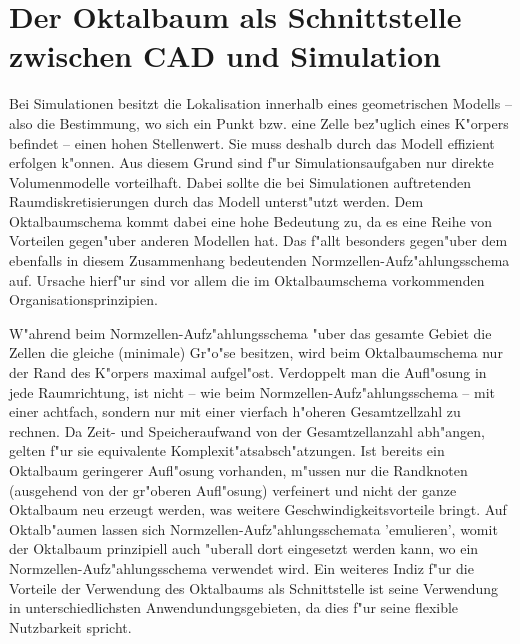 %
%

\section{Der Oktalbaum als Schnittstelle zwischen CAD und Simulation}
\label{schnittstelle_octree}
Bei Simulationen besitzt die Lokalisation innerhalb eines geometrischen 
Modells -- also die Bestimmung, wo sich ein Punkt bzw. eine Zelle bez"uglich 
eines K"orpers befindet -- einen hohen Stellenwert. 
Sie muss deshalb durch das Modell effizient erfolgen k"onnen. 
Aus diesem Grund sind f"ur Simulationsaufgaben nur direkte 
Volumenmodelle vorteilhaft. Dabei sollte die bei Simulationen auftretenden 
Raumdiskretisierungen durch das Modell unterst"utzt werden. Dem 
Oktalbaumschema kommt dabei eine hohe Bedeutung zu, da es eine Reihe von 
Vorteilen gegen"uber anderen Modellen hat. Das f"allt besonders gegen"uber 
dem ebenfalls in diesem Zusammenhang bedeutenden Normzellen-Aufz"ahlungsschema 
auf. Ursache hierf"ur sind vor allem die im Oktalbaumschema vorkommenden 
Organisationsprinzipien.
 
W"ahrend beim Normzellen-Aufz"ahlungsschema "uber 
das gesamte Gebiet die Zellen die gleiche (minimale) Gr"o"se besitzen, wird 
beim Oktalbaumschema nur der Rand des K"orpers maximal aufgel"ost. Verdoppelt 
man die Aufl"osung in jede Raumrichtung, ist nicht -- wie beim 
Normzellen-Aufz"ahlungsschema -- mit einer achtfach, sondern nur mit einer 
vierfach h"oheren Gesamtzellzahl zu rechnen. 
Da Zeit- und Speicheraufwand von der Gesamtzellanzahl abh"angen, gelten 
f"ur sie equivalente Komplexit"atsabsch"atzungen. Ist bereits ein Oktalbaum 
geringerer Aufl"osung vorhanden, m"ussen nur die Randknoten (ausgehend von 
der gr"oberen Aufl"osung) verfeinert und nicht 
der ganze Oktalbaum neu erzeugt 
werden, was weitere Geschwindigkeitsvorteile 
bringt. 
Auf Oktalb"aumen lassen sich Normzellen-Aufz"ahlungsschemata 
'emulieren', 
womit der Oktalbaum prinzipiell auch "uberall dort eingesetzt 
werden kann, wo ein Normzellen-Aufz"ahlungsschema verwendet wird. 
Ein weiteres Indiz f"ur die Vorteile der Verwendung des Oktalbaums als 
Schnittstelle ist seine Verwendung in unterschiedlichsten 
Anwendundungsgebieten, da dies f"ur seine flexible Nutzbarkeit spricht. 


